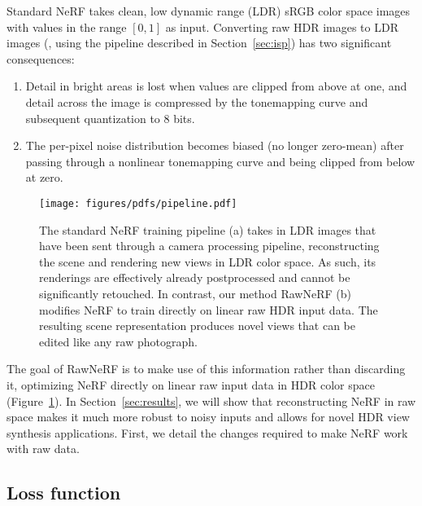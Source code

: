 Standard NeRF takes clean, low dynamic range (LDR) sRGB color space images with values in the range $[0, 1]$ as input. Converting raw HDR images to LDR images (\eg, using the pipeline described in Section~\ref{sec:isp}) has two significant consequences:
\begin{enumerate}
    \item Detail in bright areas is lost when values are clipped from above at one, and detail across the image is compressed by the tonemapping curve and subsequent quantization to 8 bits.
    \item The per-pixel noise distribution becomes biased (no longer zero-mean) after passing through a nonlinear tonemapping curve and being clipped from below at zero.
\end{enumerate}



\begin{figure}
    \centering
    \texttt{[image: figures/pdfs/pipeline.pdf]}
    \caption{
    The standard NeRF training pipeline (a) takes in LDR images that have been sent through a camera processing pipeline, reconstructing the scene and rendering new views in LDR color space. As such, its renderings are effectively already postprocessed and cannot be significantly retouched. In contrast, our method RawNeRF (b) modifies NeRF to train directly on linear raw HDR input data. The resulting scene representation produces novel views that can be edited like any raw photograph.
    }
    \label{fig:pipeline}
\end{figure}



The goal of RawNeRF is to make use of this information rather than discarding it, optimizing NeRF directly on linear raw input data in HDR color space (Figure~\ref{fig:pipeline}).
In Section~\ref{sec:results}, we will show that reconstructing NeRF in raw space makes it much more robust to noisy inputs and allows for novel HDR view synthesis applications. First, we detail the changes required to make NeRF work with raw data.









\subsection{Loss function}

